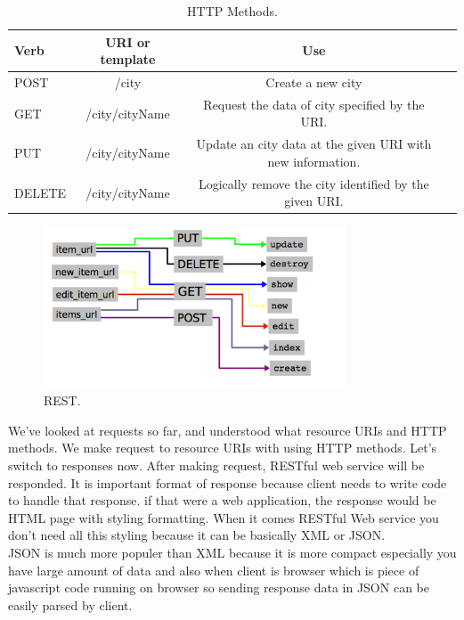 \begin{table}[!htb]
  \renewcommand{\arraystretch}{1.2} %
  \centering
  \begin{tabular}{lccc}
    \toprule
    Verb           & URI or template & Use  \\
    \midrule
    POST           & /city & Create a new city\\
    GET            & /city/{cityName} & Request the data of city specified by the URI.\\
    PUT            & /city/{cityName} & Update an city data at the given URI with new information.\\
    DELETE         & /city/{cityName} & Logically remove the city identified by the given URI.\\
    \bottomrule
  \end{tabular}
  \caption[HTTP Methods.]{HTTP Methods.}
  \label{tab:aeroCoeff}
\end{table}

\begin{figure}[!htb]
  \centering
  \includegraphics[width=0.8\textwidth]{Figures/rest.png}
  \caption[REST.]{REST.}
  \label{fig:rest}
\end{figure}

We've looked at requests so far, and understood what resource URIs and HTTP methods.
We make request to resource URIs with using HTTP methods. Let's switch to responses now.
After making request, RESTful web service will be responded. It is important format of response
because client needs to write code to handle that response. if that were a web application,
the response would be HTML page  with styling formatting. When it comes  RESTful Web service
you don't need all this styling because it can be basically  XML or JSON.\\

JSON is much more populer than XML\citep{thesis:state6} because it is more compact especially you have large amount of data
and also when client is browser which is piece of javascript code running on browser so sending response data in JSON can be
easily parsed by client.


